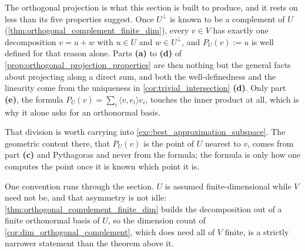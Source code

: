\begin{ainote}
The orthogonal projection is what this section is built to produce, and it rests
on less than its five properties suggest. Once $U^\perp$ is known to be a
complement of $U$ (\cref{thm:orthogonal_complement_finite_dim}), every $v \in V$
has exactly one decomposition $v = u + w$ with $u \in U$ and $w \in U^\perp$,
and $P_U(v) := u$ is well defined for that reason alone. Parts \textbf{(a)} to
\textbf{(d)} of \cref{prop:orthogonal_projection_properties} are then nothing
but the general facts about projecting along a direct sum, and both the
well-definedness and the linearity come from the uniqueness in
\cref{cor:trivial_intersection} \textbf{(d)}. Only part \textbf{(e)}, the
formula $P_U(v) = \sum_{i} \langle v, e_i \rangle e_i$, touches the inner
product at all, which is why it alone asks for an orthonormal basis.

That division is worth carrying into \cref{exc:best_approximation_subspace}.
The geometric content there, that $P_U(v)$ is the point of $U$ nearest to $v$,
comes from part \textbf{(c)} and Pythagoras and never from the formula; the
formula is only how one computes the point once it is known which point it is.

One convention runs through the section. $U$ is assumed finite-di\-men\-sional
while $V$ need not be, and that asymmetry is not idle:
\cref{thm:orthogonal_complement_finite_dim} builds the decomposition out of a
finite orthonormal basis of $U$, so the dimension count of
\cref{cor:dim_orthogonal_complement}, which does need all of $V$ finite, is a
strictly narrower statement than the theorem above it.
\end{ainote}


